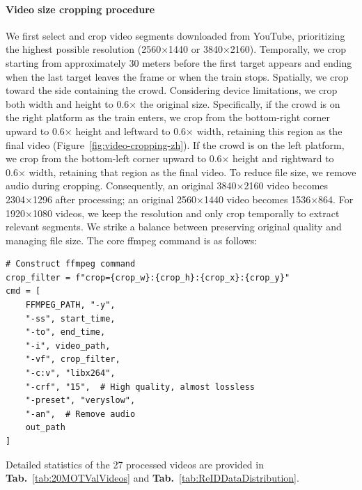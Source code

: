 \paragraph{Video size cropping procedure}
We first select and crop video segments downloaded from YouTube, prioritizing the highest possible resolution (2560×1440 or 3840×2160). Temporally, we crop starting from approximately 30 meters before the first target appears and ending when the last target leaves the frame or when the train stops. Spatially, we crop toward the side containing the crowd. Considering device limitations, we crop both width and height to 0.6× the original size. Specifically, if the crowd is on the right platform as the train enters, we crop from the bottom-right corner upward to 0.6× height and leftward to 0.6× width, retaining this region as the final video (Figure~\ref{fig:video-cropping-zh}). If the crowd is on the left platform, we crop from the bottom-left corner upward to 0.6× height and rightward to 0.6× width, retaining that region as the final video. To reduce file size, we remove audio during cropping. Consequently, an original 3840×2160 video becomes 2304×1296 after processing; an original 2560×1440 video becomes 1536×864. For 1920×1080 videos, we keep the resolution and only crop temporally to extract relevant segments. We strike a balance between preserving original quality and managing file size. The core ffmpeg command is as follows:
\begin{verbatim}
# Construct ffmpeg command
crop_filter = f"crop={crop_w}:{crop_h}:{crop_x}:{crop_y}"
cmd = [
    FFMPEG_PATH, "-y",
    "-ss", start_time,
    "-to", end_time,
    "-i", video_path,
    "-vf", crop_filter,
    "-c:v", "libx264",
    "-crf", "15",  # High quality, almost lossless
    "-preset", "veryslow",
    "-an",  # Remove audio
    out_path
]
\end{verbatim}
Detailed statistics of the 27 processed videos are provided in \textbf{Tab.}~\ref{tab:20MOTValVideos} and \textbf{Tab.}~\ref{tab:ReIDDataDistribution}.

